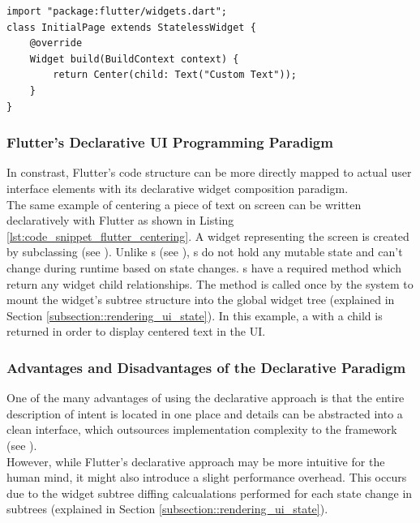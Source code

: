 \begin{minipage}{\linewidth}
    \begin{lstlisting}[caption={Flutter Example of Centering Text on a Screen}, label={lst:code_snippet_flutter_centering}]
import "package:flutter/widgets.dart";
class InitialPage extends StatelessWidget {
    @override
    Widget build(BuildContext context) {
        return Center(child: Text("Custom Text"));
    }
}
    \end{lstlisting}
\end{minipage}

\subsubsection{Flutter's Declarative UI Programming Paradigm}
In constrast, Flutter's code structure can be more directly mapped to actual user interface elements with its declarative widget composition paradigm.\\
The same example of centering a piece of text on screen can be written declaratively with Flutter as shown in Listing \ref{lst:code_snippet_flutter_centering}.
A widget representing the screen is created by subclassing  (see \cite{StatelessWidgetDocumentation2021}). 
Unlike s (see \cite{StatefulWidgetDocumentation2021}), s do not hold any mutable state and can't change during runtime based on state changes. 
s have a required  method which return any widget child relationships. The method is called 
once by the system to mount the widget's subtree structure into the global widget tree (explained in Section \ref{subsection::rendering_ui_state}).
In this example, a  with a  child is returned in order to display centered text in the UI.\\

\subsubsection{Advantages and Disadvantages of the Declarative Paradigm}
One of the many advantages of using the declarative approach is that the entire description of intent is located in one place and details can be abstracted into
a clean interface, which outsources implementation complexity to the framework (see \cite{FlutterDeclarative2021}).\\
However, while Flutter's declarative approach may be more intuitive for the human mind, it might also introduce a slight performance overhead.
This occurs due to the widget subtree diffing calcualations performed for each state change in  subtrees (explained in Section \ref{subsection::rendering_ui_state}).\\

